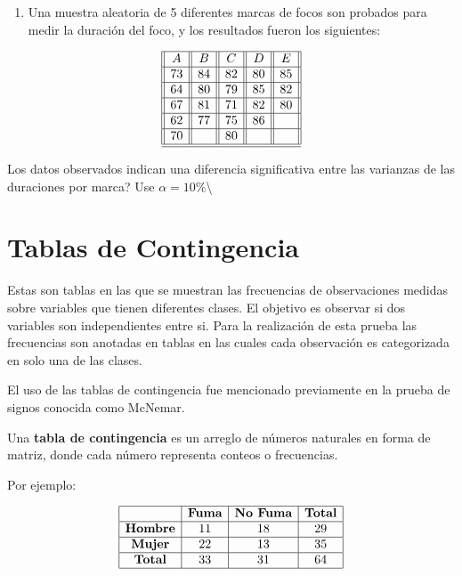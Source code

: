 \documentclass[a4paper,oneside,openany]{book}
\providecommand{\tightlist}{%
  \setlength{\itemsep}{0pt}\setlength{\parskip}{0pt}}
\begin{document}
\begin{enumerate}
\def\labelenumi{\arabic{enumi}.}
\tightlist
\item
  Una muestra aleatoria de 5 diferentes marcas de focos son probados
  para medir la duración del foco, y los resultados fueron los
  siguientes:
\end{enumerate}

\[
\begin{equation*}
\begin{array}{||c| |c| |c| |c||c||} 
\hline 
A & B&C&D&E \\ 
 \hline
73&84&82&80&85\\
 \hline
64&80&79&85&82\\
 \hline
67&81&71&82&80\\
 \hline
62&77&75&86&\\
 \hline
70&&80&&\\
\hline
\hline
\end{array}
\end{equation*}
\]

Los datos observados indican una diferencia significativa entre las
varianzas de las duraciones por marca? Use
\(\alpha=10\%\)\textbackslash{}

\chapter*{Tablas de Contingencia}\label{tablas-de-contingencia}


Estas son tablas en las que se muestran las frecuencias de observaciones
medidas sobre variables que tienen diferentes clases. El objetivo es
observar si dos variables son independientes entre si. Para la
realización de esta prueba las frecuencias son anotadas en tablas en las
cuales cada observación es categorizada en solo una de las clases.

El uso de las tablas de contingencia fue mencionado previamente en la
prueba de signos conocida como McNemar.

Una \textbf{tabla de contingencia} es un arreglo de números naturales en
forma de matriz, donde cada número representa conteos o frecuencias.

Por ejemplo:

\[
\begin{equation*}
\begin{array}{|c|c|c|c|} 
\hline
&\textbf{Fuma} &\textbf{No Fuma} &\textbf{Total}\\
\hline
\textbf{Hombre} &11 &18 &29\\
\hline
\textbf{Mujer} &22 &13 &35\\
\hline
\textbf{Total}& 33& 31 &64\\
\hline
\end {array}
\end {equation*}
\]
\end{document}
